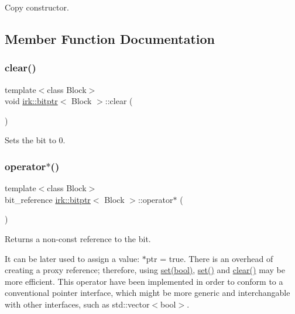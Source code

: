 Copy constructor. 



\subsection{Member Function Documentation}
\mbox{\label{classirk_1_1bitptr_acb0f89f9751fc114558234b79d49aac6}} 
\subsubsection{\texorpdfstring{clear()}{clear()}}
{\footnotesize\ttfamily template$<$class Block$>$ \\
void \mbox{\hyperlink{classirk_1_1bitptr}{irk\+::bitptr}}$<$ Block $>$\+::clear (\begin{DoxyParamCaption}{ }\end{DoxyParamCaption})\hspace{0.3cm}{\ttfamily [inline]}}



Sets the bit to 0. 

\mbox{\label{classirk_1_1bitptr_a6676fe4fc076f0cb53587ea48d8634c3}} 
\subsubsection{\texorpdfstring{operator$\ast$()}{operator*()}\hspace{0.1cm}{\footnotesize\ttfamily [1/2]}}
{\footnotesize\ttfamily template$<$class Block$>$ \\
bit\+\_\+reference \mbox{\hyperlink{classirk_1_1bitptr}{irk\+::bitptr}}$<$ Block $>$\+::operator$\ast$ (\begin{DoxyParamCaption}{ }\end{DoxyParamCaption})\hspace{0.3cm}{\ttfamily [inline]}}



Returns a non-\/const reference to the bit. 

It can be later used to assign a value\+: {\ttfamily $\ast$ptr = true}. There is an overhead of creating a proxy reference; therefore, using {\ttfamily \mbox{\hyperlink{classirk_1_1bitptr_ab690150f670134eb879fceb83d892073}{set(bool)}}}, {\ttfamily \mbox{\hyperlink{classirk_1_1bitptr_a11089c343ac361d3ca5d86f8109c2d42}{set()}}} and {\ttfamily \mbox{\hyperlink{classirk_1_1bitptr_acb0f89f9751fc114558234b79d49aac6}{clear()}}} may be more efficient. This operator have been implemented in order to conform to a conventional pointer interface, which might be more generic and interchangable with other interfaces, such as {\ttfamily std\+::vector$<$bool$>$}. \mbox{\label{classirk_1_1bitptr_a4cb8f7ff26e561a9348f79082ad6af35}} 

